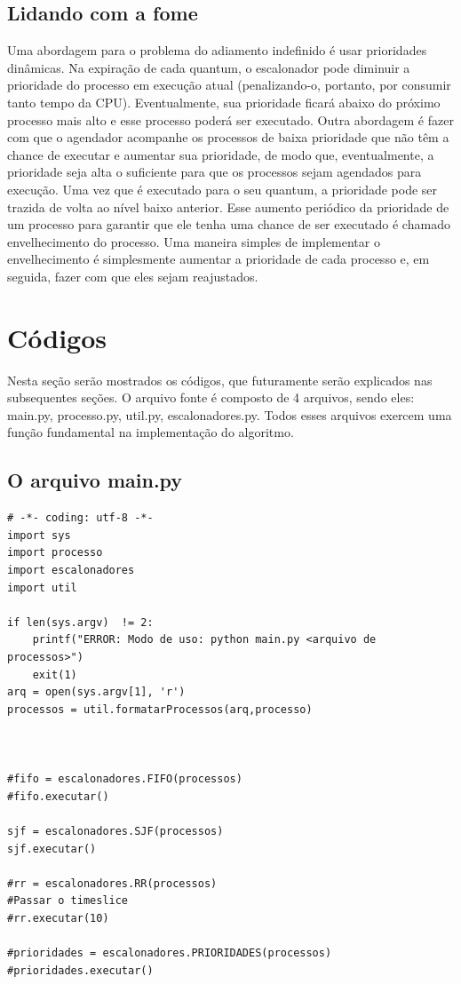 \documentclass[times, 10pt,twocolumn]{article}
\begin{document}
\subsection{Lidando com a fome}
Uma abordagem para o problema do adiamento indefinido é usar prioridades dinâmicas. Na expiração de cada quantum, o escalonador pode diminuir a prioridade do processo em execução atual (penalizando-o, portanto, por consumir tanto tempo da CPU). Eventualmente, sua prioridade ficará abaixo do próximo processo mais alto e esse processo poderá ser executado.
Outra abordagem é fazer com que o agendador acompanhe os processos de baixa prioridade que não têm a chance de executar e aumentar sua prioridade, de modo que, eventualmente, a prioridade seja alta o suficiente para que os processos sejam agendados para execução. Uma vez que é executado para o seu quantum, a prioridade pode ser trazida de volta ao nível baixo anterior.
Esse aumento periódico da prioridade de um processo para garantir que ele tenha uma chance de ser executado é chamado envelhecimento do processo. Uma maneira simples de implementar o envelhecimento é simplesmente aumentar a prioridade de cada processo e, em seguida, fazer com que eles sejam reajustados. \cite{tutorialspoint}  
  
\section{Códigos}   
Nesta seção serão mostrados os códigos, que futuramente serão explicados nas subsequentes seções. O arquivo fonte é composto de 4 arquivos, sendo eles: main.py, processo.py, util.py, escalonadores.py. Todos esses arquivos exercem uma função fundamental na implementação do algoritmo.
\subsection{O arquivo main.py} 
\begin{lstlisting}
# -*- coding: utf-8 -*- 
import sys
import processo 
import escalonadores
import util

if len(sys.argv)  != 2: 
	printf("ERROR: Modo de uso: python main.py <arquivo de processos>")
	exit(1)
arq = open(sys.argv[1], 'r')
processos = util.formatarProcessos(arq,processo) 



#fifo = escalonadores.FIFO(processos)
#fifo.executar()  

sjf = escalonadores.SJF(processos)  
sjf.executar()

#rr = escalonadores.RR(processos)   
#Passar o timeslice
#rr.executar(10)

#prioridades = escalonadores.PRIORIDADES(processos) 
#prioridades.executar()  
\end{lstlisting}  
\end{document}
